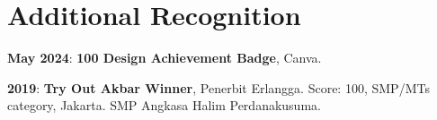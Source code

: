 \documentclass[11pt,a4paper]{article}
\newcommand{\cvitem}[2]{\textbf{#1}: #2\par}
\begin{document}
\section{Additional Recognition}
\cvitem{May 2024}{\textbf{100 Design Achievement Badge}, Canva.}
\cvitem{2019}{\textbf{Try Out Akbar Winner}, Penerbit Erlangga. Score: 100, SMP/MTs category, Jakarta. SMP Angkasa Halim Perdanakusuma.}
\end{document}
